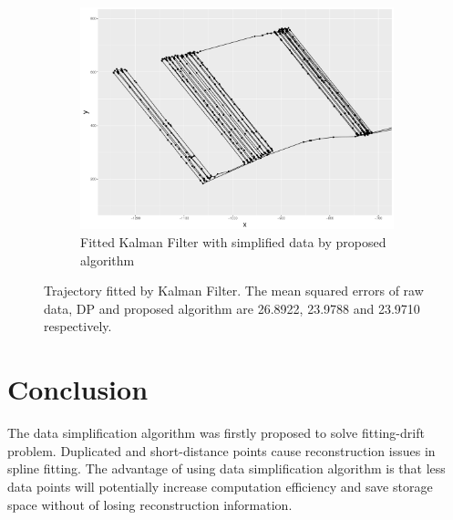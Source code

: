 \begin{figure}[h]
\begin{subfigure}[t]{0.47\textwidth}
\includegraphics[width=\linewidth]{Chapters/06Spinoff/plot/ggSPKF.pdf}
\caption{Fitted Kalman Filter with simplified data by proposed algorithm}
\end{subfigure}
\caption{Trajectory fitted by Kalman Filter. The mean squared errors of raw data, DP and proposed algorithm are 26.8922, 23.9788 and 23.9710 respectively.}\label{DataSimpKFTra}
\end{figure}


\section{Conclusion}

The data simplification algorithm was firstly proposed to solve fitting-drift problem. Duplicated and short-distance points cause reconstruction issues in spline fitting. The advantage of using data simplification algorithm is that less data points will potentially increase computation efficiency and save storage space without of losing reconstruction information.  













